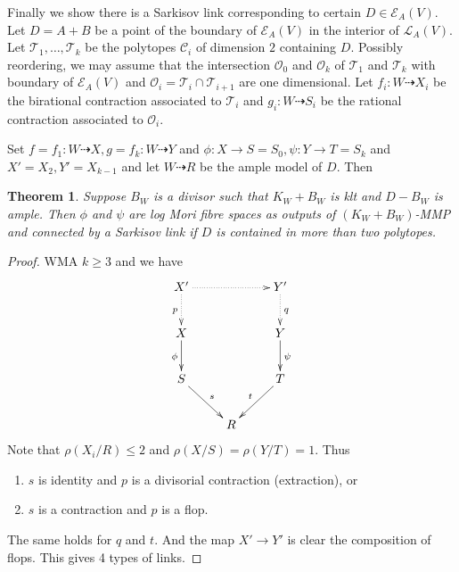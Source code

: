 \documentclass{article}
\newtheorem{thm}[defn]{Theorem}
\begin{document}
Finally we show there is a Sarkisov link corresponding to certain $D \in \mathcal{E}_{A}(V)$. Let $ D=A+B $ be a point of the boundary of $ \mathcal{E}_A(V) $ in the interior of $ \mathcal{L}_A(V) $. Let $ \mathcal{T}_1, \ldots, \mathcal{T}_k $ be the polytopes $ \mathcal{C}_i $ of dimension $ 2 $ containing $ D $. Possibly reordering, we may assume that  the intersection  $ \mathcal{O}_0 $ and $ \mathcal{O}_k $ of $ \mathcal{T}_1 $ and $ \mathcal{T}_k $ with boundary of $ \mathcal{E}_A(V) $ and  $ \mathcal{O}_i=\mathcal{T}_i\cap\mathcal{T}_{i+1} $ are one dimensional. Let $ f_i:W\dashrightarrow  X_i $ be the birational contraction associated to $ \mathcal{T}_i $ and $ g_i:W\dashrightarrow  S_i $ be the rational contraction associated to $ \mathcal{O}_i $.


Set $ f=f_1:W\dashrightarrow X, g=f_k:W\dashrightarrow Y $ and $ \phi:X\to S=S_0,\psi:Y\to T=S_k $ and $ X'=X_2,Y'=X_{k-1} $ and let $ W\dashrightarrow R $ be the ample model of $ D $. Then
\begin{thm}\label{constructlink}
  \cite[Theorem 3.7]{haconSarkisovProgram2011} Suppose $ B_W $ is a divisor such that $ K_W+B_W $ is klt and $ D-B_W $ is ample. Then $ \phi $ and $ \psi $ are log Mori fibre spaces as outputs of $ (K_W+B_W) $-MMP and connected by a Sarkisov link if $ D $ is contained in more than two polytopes.
\end{thm}
\begin{proof}
  WMA $ k\geqslant 3 $ and we have 
  $$ \xymatrix{
  X'\ar@{.>}[d]_p\ar@{.>}[rr]&&Y'\ar@{.>}[d]^q\\
  X\ar[d]_{\phi}&&Y\ar[d]^\psi\\
  S\ar[rd]^s&&T\ar[ld]_t\\
  &R&} $$
Note that $ \rho(X_i/R)\leqslant 2 $ and $ \rho(X/S)=\rho(Y/T)=1 $. Thus 
\begin{enumerate}
  \item $ s $ is identity and $ p $ is a divisorial contraction (extraction), or
  \item $ s $ is a contraction and $ p $ is a flop.
\end{enumerate}
The same holds for $ q $ and $ t $. And the map $X'\to Y'$ is clear the composition of flops. This gives 4 types of links.
\end{proof}
\end{document}

